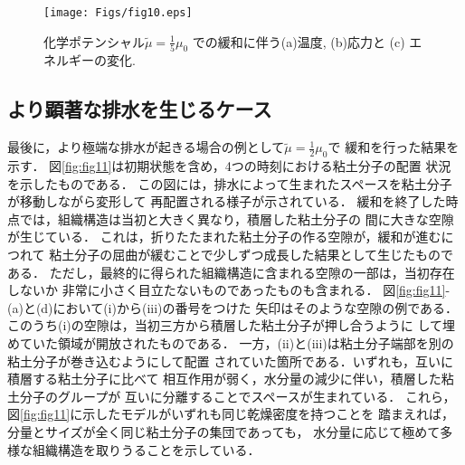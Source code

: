 \begin{figure}[h]
	\begin{center}
	\texttt{[image: Figs/fig10.eps]} 
	\end{center}
	\caption{
		化学ポテンシャル$\tilde \mu =\frac{1}{5}\mu_0$
		での緩和に伴う(a)温度, (b)応力と (c) エネルギーの変化.
	} 
	\label{fig:fig10}
\end{figure}
\subsection{より顕著な排水を生じるケース}
最後に，より極端な排水が起きる場合の例として$\tilde \mu =\frac{1}{2}\mu_0$で
緩和を行った結果を示す．
図\ref{fig:fig11}は初期状態を含め，4つの時刻における粘土分子の配置
状況を示したものである．
この図には，排水によって生まれたスペースを粘土分子が移動しながら変形して
再配置される様子が示されている．
緩和を終了した時点では，組織構造は当初と大きく異なり，積層した粘土分子の
間に大きな空隙が生じている．
これは，折りたたまれた粘土分子の作る空隙が，緩和が進むにつれて
粘土分子の屈曲が緩むことで少しずつ成長した結果として生じたものである．
ただし，最終的に得られた組織構造に含まれる空隙の一部は，当初存在しないか
非常に小さく目立たないものであったものも含まれる．
図\ref{fig:fig11}-(a)と(d)において(i)から(iii)の番号をつけた
矢印はそのような空隙の例である．
このうち(i)の空隙は，当初三方から積層した粘土分子が押し合うように
して埋めていた領域が開放されたものである．
一方，(ii)と(iii)は粘土分子端部を別の粘土分子が巻き込むようにして配置
されていた箇所である．いずれも，互いに積層する粘土分子に比べて
相互作用が弱く，水分量の減少に伴い，積層した粘土分子のグループが
互いに分離することでスペースが生まれている．
これら，図\ref{fig:fig11}に示したモデルがいずれも同じ乾燥密度を持つことを
踏まえれば，分量とサイズが全く同じ粘土分子の集団であっても，
水分量に応じて極めて多様な組織構造を取りうることを示している．

